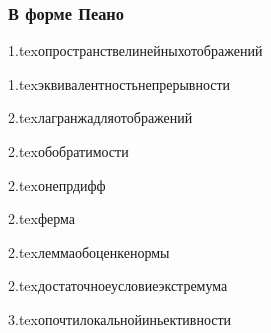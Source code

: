 \subsubsection{В форме Пеано}

{1.tex}{опространствелинейныхотображений}

{1.tex}{эквивалентностьнепрерывности}

{2.tex}{лагранжадляотображений}

{2.tex}{обобратимости}

{2.tex}{онепрдифф}

{2.tex}{ферма}

{2.tex}{леммаобоценкенормы}

{2.tex}{достаточноеусловиеэкстремума}

{3.tex}{опочтилокальнойиньективности}




